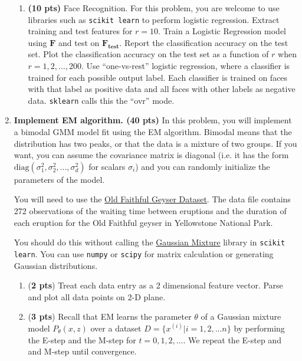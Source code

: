 \begin{enumerate}
\begin{enumerate}
\item \textbf{(10 pts)} \label{part:facerec} Face Recognition. For this problem, you are welcome to use libraries such as \texttt{scikit learn} to perform logistic regression. Extract training and test features for $r=10$. Train a Logistic Regression model using $\mathbf{F}$ and test on $\mathbf{F_{test}}$. Report the classification accuracy on the test set. Plot the classification accuracy on the test set as a function of $r$ when $r = 1, 2, \dots, 200$. Use ``one-vs-rest'' logistic regression, where a classifier is trained for each possible output label. Each classifier is trained on faces with that label as positive data and all faces with other labels as negative data. \verb+sklearn+ calls this the ``ovr'' mode.

\end{enumerate}


\item \textbf{Implement EM algorithm. (40 pts)}
In this problem, you will implement a bimodal GMM model fit using the EM algorithm. Bimodal means that the distribution has two peaks, or that the data is a mixture of two groups. If you want, you can assume the covariance matrix is diagonal (i.e. it has the form $\text{diag}(\sigma_1^2,\sigma_2^2,...,\sigma_d^2)$ for scalars $\sigma_i$) and you can randomly initialize the parameters of the model. 

You will need to use the \href{http://www.stat.cmu.edu/~larry/all-of-statistics/=data/faithful.dat}{Old Faithful Geyser Dataset}. The data file contains 272 observations of the waiting time between eruptions and the duration of each eruption for the Old Faithful geyser in Yellowstone National Park.

You should do this without calling the \href{https://scikit-learn.org/stable/modules/generated/sklearn.mixture.GaussianMixture.html#sklearn.mixture.GaussianMixture}{Gaussian Mixture} library in \texttt{scikit learn}. You can use \texttt{numpy} or \texttt{scipy} for matrix calculation or generating Gaussian distributions. 

\begin{enumerate}
\item (\textbf{2 pts}) Treat each data entry as a 2 dimensional feature vector. Parse and plot all data points on 2-D plane. 

\item (\textbf{3 pts}) Recall that EM learns the parameter $\theta$ of a Gaussian mixture model $P_{\theta}(x, z)$ over a dataset $D = \{x^{(i)} | i = 1, 2, ... n\}$ by performing the E-step and the M-step for $t=0,1,2,\ldots$. We repeat the E-step and and M-step until convergence.


\end{enumerate}
\end{enumerate}
